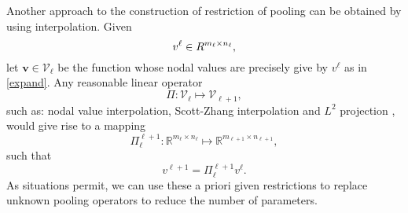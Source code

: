 Another approach to the construction of restriction of pooling can be 
obtained by using interpolation. 
Given 
$$
v^\ell\in \mathbb \mathbb R^{m_{\ell}\times n_{\ell}}, 
$$
let $\bm v\in \mathcal V_\ell$ be the function whose nodal values are
precisely give by $v^\ell$ as in \eqref{expand}.  
Any reasonable linear operator
\begin{equation}
\label{eq:11}
\Pi:  \mathcal V_\ell\mapsto \mathcal V_{\ell+1},
\end{equation}
such as: 
nodal value interpolation, 
Scott-Zhang interpolation and
$L^2$ projection \cite{xu2019FEM},
would give rise to a mapping
\begin{equation}
\label{mg-Pi}
\Pi_\ell^{\ell+1}: \mathbb R^{m_{\ell}\times n_{\ell}}  \mapsto
\mathbb R^{m_{\ell+1}\times n_{\ell+1}},
\end{equation}
such that
$$
v^{\ell+1}=\Pi_\ell^{\ell+1} v^\ell.
$$
As situations permit, we can use these a priori given restrictions to replace
unknown pooling operators to reduce the number of parameters.





